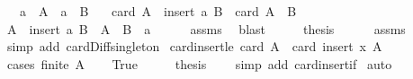 \begin{isabellebody}
\ \ \ {\isachardoublequoteopen}a\ {\isasymin}\ A{\isachardoublequoteclose}\ \ {\isachardoublequoteopen}a\ {\isasymnotin}\ B{\isachardoublequoteclose}\isanewline
\ \ \ {\isachardoublequoteopen}card\ {\isacharparenleft}{\kern0pt}A\ {\isacharminus}{\kern0pt}\ insert\ a\ B{\isacharparenright}{\kern0pt}\ {\isacharequal}{\kern0pt}\ card\ {\isacharparenleft}{\kern0pt}A\ {\isacharminus}{\kern0pt}\ B{\isacharparenright}{\kern0pt}\ {\isacharminus}{\kern0pt}\ {}{\isachardoublequoteclose}\isanewline
%
\isadelimproof
%
\endisadelimproof
%
\isatagproof
{}\isamarkupfalse%
\ {\isacharminus}{\kern0pt}\isanewline
\ \ \isamarkupfalse%
\ {\isachardoublequoteopen}A\ {\isacharminus}{\kern0pt}\ insert\ a\ B\ {\isacharequal}{\kern0pt}\ {\isacharparenleft}{\kern0pt}A\ {\isacharminus}{\kern0pt}\ B{\isacharparenright}{\kern0pt}\ {\isacharminus}{\kern0pt}\ {\isacharbraceleft}{\kern0pt}a{\isacharbraceright}{\kern0pt}{\isachardoublequoteclose}\isanewline
\ \ \ \ \isamarkupfalse%
\ assms\ \isamarkupfalse%
\ blast\isanewline
\ \ \isamarkupfalse%
\ \isamarkupfalse%
\ {\isacharquery}{\kern0pt}thesis\isanewline
\ \ \ \ \isamarkupfalse%
\ assms\ \isamarkupfalse%
\ {\isacharparenleft}{\kern0pt}simp\ add{\isacharcolon}{\kern0pt}\ card{\isacharunderscore}{\kern0pt}Diff{\isacharunderscore}{\kern0pt}singleton{\isacharparenright}{\kern0pt}\isanewline
{}\isamarkupfalse%
%
\endisatagproof
{\isafoldproof}%
%
\isadelimproof
\isanewline
%
\endisadelimproof
\isanewline
{}\isamarkupfalse%
\ card{\isacharunderscore}{\kern0pt}insert{\isacharunderscore}{\kern0pt}le{\isacharcolon}{\kern0pt}\ {\isachardoublequoteopen}card\ A\ {\isasymle}\ card\ {\isacharparenleft}{\kern0pt}insert\ x\ A{\isacharparenright}{\kern0pt}{\isachardoublequoteclose}\isanewline
%
\isadelimproof
%
\endisadelimproof
%
\isatagproof
{}\isamarkupfalse%
\ {\isacharparenleft}{\kern0pt}cases\ {\isachardoublequoteopen}finite\ A{\isachardoublequoteclose}{\isacharparenright}{\kern0pt}\isanewline
\ \ \isamarkupfalse%
\ True\isanewline
\ \ \isamarkupfalse%
\ \isamarkupfalse%
\ {\isacharquery}{\kern0pt}thesis\ \ \ \isamarkupfalse%
\ {\isacharparenleft}{\kern0pt}simp\ add{\isacharcolon}{\kern0pt}\ card{\isacharunderscore}{\kern0pt}insert{\isacharunderscore}{\kern0pt}if{\isacharparenright}{\kern0pt}\isanewline
{}\isamarkupfalse%
\ auto%

\end{isabellebody}
